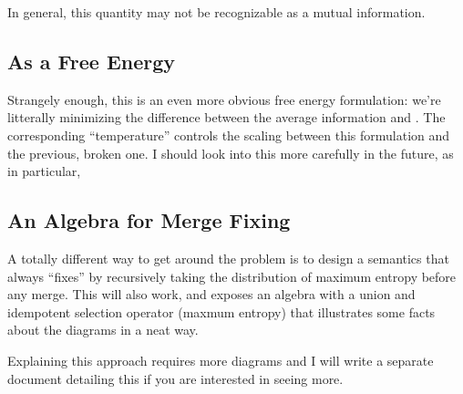 \documentclass{article}
\begin{document}
	In general, this quantity may not be recognizable as a mutual information.	
	
	\subsection{As a Free Energy}
	Strangely enough, this is an even more obvious free energy formulation: we're litterally minimizing the difference between the average information and . The corresponding ``temperature'' controls the scaling between this formulation and the previous, broken one. I should look into this more carefully in the future, as in particular, 
	
	\subsection{An Algebra for Merge Fixing}
	A totally different way to get around the problem is to design a semantics that always ``fixes'' by recursively taking the distribution of maximum entropy before any merge. This will also work, and exposes an algebra with a union and idempotent selection operator (maxmum entropy) that illustrates some facts about the diagrams in a neat way. 
	
	Explaining this approach requires more diagrams and I will write a separate document detailing this if you are interested in seeing more.
	
\end{document}
